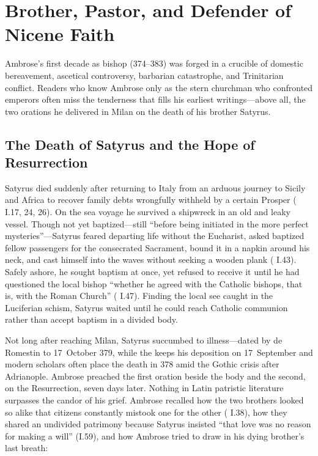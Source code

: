 \section{Brother, Pastor, and Defender of Nicene Faith}

Ambrose's first decade as bishop (374--383) was forged in a crucible of domestic bereavement, ascetical controversy, barbarian catastrophe, and Trinitarian conflict. Readers who know Ambrose only as the stern churchman who confronted emperors often miss the tenderness that fills his earliest writings---above all, the two orations he delivered in Milan on the death of his brother Satyrus.

\subsection{The Death of Satyrus and the Hope of Resurrection}

Satyrus died suddenly after returning to Italy from an arduous journey to Sicily and Africa to recover family debts wrongfully withheld by a certain Prosper ( I.17, 24, 26). On the sea voyage he survived a shipwreck in an old and leaky vessel. Though not yet baptized---still ``before being initiated in the more perfect mysteries''---Satyrus feared departing life without the Eucharist, asked baptized fellow passengers for the consecrated Sacrament, bound it in a napkin around his neck, and cast himself into the waves without seeking a wooden plank ( I.43). Safely ashore, he sought baptism at once, yet refused to receive it until he had questioned the local bishop ``whether he agreed with the Catholic bishops, that is, with the Roman Church'' ( I.47). Finding the local see caught in the Luciferian schism, Satyrus waited until he could reach Catholic communion rather than accept baptism in a divided body.

Not long after reaching Milan, Satyrus succumbed to illness---dated by de Romestin to 17~October 379, while the  keeps his deposition on 17~September and modern scholars often place the death in 378 amid the Gothic crisis after Adrianople. Ambrose preached the first oration beside the body and the second, on the Resurrection, seven days later. Nothing in Latin patristic literature surpasses the candor of his grief. Ambrose recalled how the two brothers looked so alike that citizens constantly mistook one for the other ( I.38), how they shared an undivided patrimony because Satyrus insisted ``that love was no reason for making a will'' (I.59), and how Ambrose tried to draw in his dying brother's last breath:

